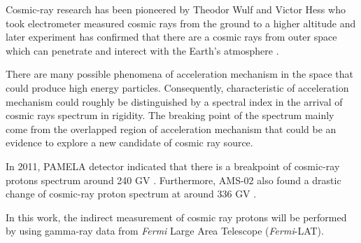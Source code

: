 \par Cosmic-ray research has been pioneered by Theodor Wulf and Victor Hess who took electrometer measured cosmic rays from the ground to a higher altitude and later experiment has confirmed that there are a cosmic rays from outer space which can penetrate and interect with the Earth's atmosphere \cite{HESS,Pacini,Clay}.

\par There are many possible phenomena of acceleration mechanism in the
space that could produce high energy particles. Consequently, characteristic of acceleration mechanism could roughly be distinguished by a spectral index in the arrival of cosmic rays spectrum in rigidity.
The breaking point of the spectrum mainly come from the overlapped region of acceleration mechanism that could be an evidence to explore a new candidate of cosmic ray source.

In 2011, PAMELA detector indicated that there is a breakpoint of cosmic-ray protons spectrum around 240 GV \cite{PAMELA}.
Furthermore, AMS-02 also found a drastic change of cosmic-ray proton spectrum at around 336 GV \cite{AMS-02}.

\par In this work, the indirect measurement of cosmic ray protons will be performed by using gamma-ray data from \textit{Fermi} Large Area Telescope (\textit{Fermi}-LAT).